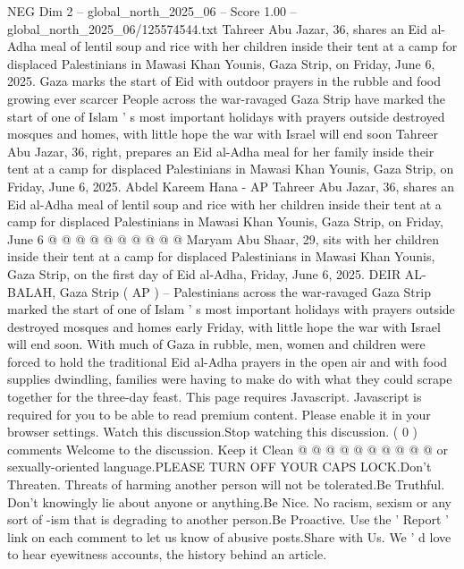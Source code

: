 \begin{textsample}{NEG Dim 2 – global\_north\_2025\_06 – Score 1.00 – global\_north\_2025\_06/125574544.txt}  \label{ex:f2_neg_086}
Tahreer Abu Jazar, 36, shares an Eid al-Adha meal of lentil soup and rice with her children inside their tent at a camp for displaced Palestinians in Mawasi Khan Younis, Gaza Strip, on Friday, June 6, 2025.
Gaza marks the start of Eid with outdoor prayers in the rubble and food growing ever scarcer People across the war-ravaged Gaza Strip have marked the start of one of Islam ' s most important holidays with prayers outside destroyed mosques and homes, with little hope the war with Israel will end soon Tahreer Abu Jazar, 36, right, prepares an Eid al-Adha meal for her family inside their tent at a camp for displaced Palestinians in Mawasi Khan Younis, Gaza Strip, on Friday, June 6, 2025.
Abdel Kareem Hana - AP Tahreer Abu Jazar, 36, shares an Eid al-Adha meal of lentil soup and rice with her children inside their tent at a camp for displaced Palestinians in Mawasi Khan Younis, Gaza Strip, on Friday, June 6 @ @ @ @ @ @ @ @ @ @ Maryam Abu Shaar, 29, sits with her children inside their tent at a camp for displaced Palestinians in Mawasi Khan Younis, Gaza Strip, on the first day of Eid al-Adha, Friday, June 6, 2025.
DEIR AL-BALAH, Gaza Strip ( AP ) -- Palestinians across the war-ravaged Gaza Strip marked the start of one of Islam ' s most important holidays with prayers outside destroyed mosques and homes early Friday, with little hope the war with Israel will end soon.
With much of Gaza in rubble, men, women and children were forced to hold the traditional Eid al-Adha prayers in the open air and with food supplies dwindling, families were having to make do with what they could scrape together for the three-day feast.
This page requires Javascript.
Javascript is required for you to be able to read premium content.
Please enable it in your browser settings.
Watch this discussion.Stop watching this discussion. ( 0 ) comments Welcome to the discussion.
Keep it Clean @ @ @ @ @ @ @ @ @ @ or sexually-oriented language.PLEASE TURN OFF YOUR CAPS LOCK.Don't Threaten.
Threats of harming another person will not be tolerated.Be Truthful.
Don't knowingly lie about anyone or anything.Be Nice.
No racism, sexism or any sort of -ism that is degrading to another person.Be Proactive.
Use the ' Report ' link on each comment to let us know of abusive posts.Share with Us.
We ' d love to hear eyewitness accounts, the history behind an article.

\end{textsample}

